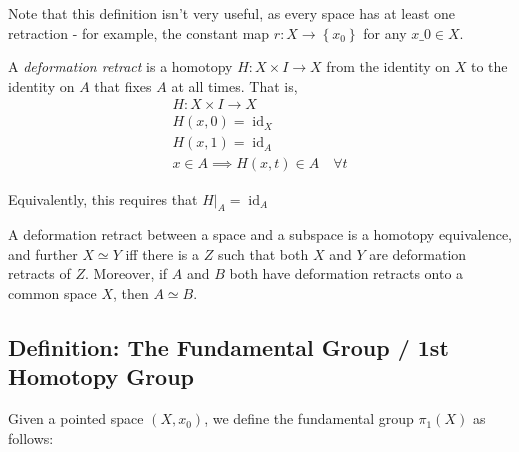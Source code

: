 Note that this definition isn't very useful, as every space has at least
one retraction - for example, the constant map
\(r:X \to\left\{{x_0}\right\}\) for any \(x\_0 \in X\).

A \emph{deformation retract} is a homotopy \(H:X\times I \to X\) from
the identity on \(X\) to the identity on \(A\) that fixes \(A\) at all
times. That is,
\begin{align*}
H: X\times I \to X \\
H(x, 0) = \operatorname{id}_X \\
H(x, 1) = \operatorname{id}_A \\
x\in A \implies H(x, t) \in A \quad \forall t
\end{align*}

Equivalently, this requires that
\({\left.{{H}} \right|_{{A}} } = \operatorname{id}_A\)

A deformation retract between a space and a subspace is a homotopy
equivalence, and further \(X\simeq Y\) iff there is a \(Z\) such that
both \(X\) and \(Y\) are deformation retracts of \(Z\). Moreover, if
\(A\) and \(B\) both have deformation retracts onto a common space
\(X\), then \(A \simeq B\).

\hypertarget{definition-the-fundamental-group-1st-homotopy-group}{%
\subsection{Definition: The Fundamental Group / 1st Homotopy
Group}\label{definition-the-fundamental-group-1st-homotopy-group}}

Given a pointed space \((X,x_0)\), we define the fundamental group
\(\pi_1(X)\) as follows:

